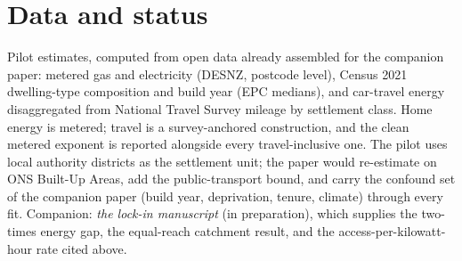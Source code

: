\documentclass[10pt]{article}
\begin{document}
\section*{Data and status}

Pilot estimates, computed from open data already assembled for the companion
paper: metered gas and electricity (DESNZ, postcode level), Census 2021
dwelling-type composition and build year (EPC medians), and car-travel energy
disaggregated from National Travel Survey mileage by settlement class. Home
energy is metered; travel is a survey-anchored construction, and the clean
metered exponent is reported alongside every travel-inclusive one. The pilot
uses local authority districts as the settlement unit; the paper would
re-estimate on ONS Built-Up Areas, add the public-transport bound, and carry
the confound set of the companion paper (build year, deprivation, tenure,
climate) through every fit. Companion: \emph{the lock-in manuscript} (in
preparation), which supplies the two-times energy gap, the equal-reach
catchment result, and the access-per-kilowatt-hour rate cited above.
\end{document}
